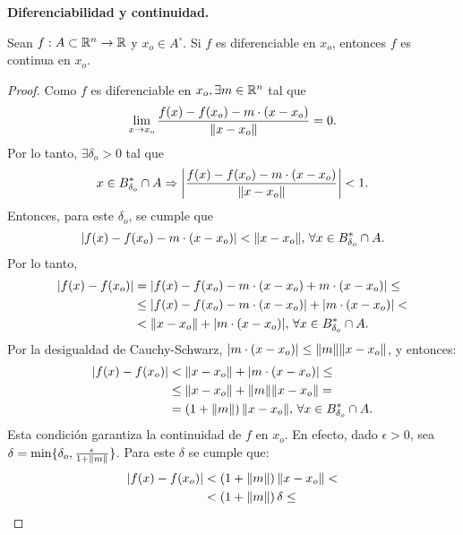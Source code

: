 \begin{theorem}\textbf{Diferenciabilidad y continuidad.} \label{teo:difCont}
\mbox{}

Sean $f: A \subset \mathbb{R}^n \to \mathbb{R}$ y $x_o \in  A^{\circ}$. Si $f$ es diferenciable en $x_o$, entonces $f$ es continua en $x_o$.
 \begin{proof}
 \mbox{}
 
 Como $f$ es diferenciable en $x_o, \exists m \in \mathbb{R}^n$ tal que
 \[
  \lim_{x \to x_o} \frac{f(x) - f(x_o) - m \cdot (x - x_o)}{\norm{x - x_o}} = 0.
 \]
Por lo tanto, $\exists \delta_o > 0$ tal que 
\[
 x \in B_{\delta_o}^* \cap A \Rightarrow 
 \abs{ \frac{f(x) - f(x_o) - m \cdot (x - x_o)}{\norm{x - x_o}} } < 1.
\]
Entonces, para este $\delta_o$, se cumple que
\[
 \abs{ f(x) - f(x_o) - m \cdot (x - x_o) } < \norm{x - x_o}, \, \forall x \in B_{\delta_o}^* \cap A.
\]
Por lo tanto,
\begin{align*}
\abs{ f(x) - f(x_o) } &=   \abs{ f(x) - f(x_o) - m \cdot (x - x_o) + m \cdot (x - x_o) } \le \\
                      &\le \abs{ f(x) - f(x_o) - m \cdot (x - x_o) } + \abs{ m \cdot (x - x_o) } < \\
                      &< \norm{x - x_o} + \abs{ m \cdot (x - x_o) }, \, 
                      \forall x \in B^*_{\delta_o} \cap A.
\end{align*}
Por la desigualdad de Cauchy-Schwarz, $\abs{ m \cdot (x - x_o) } \le \norm{m} \norm{x - x_o}$, y entonces:
\begin{align*}
\abs{ f(x) - f(x_o) } &< \norm{x - x_o} + \abs{ m \cdot (x - x_o) } \le \\
                      &\le \norm{x - x_o} + \norm{m} \norm{x - x_o} = \\
                      &=  \left( 1 + \norm{m} \right) \norm{x - x_o}, \, 
                      \forall x \in B^*_{\delta_o} \cap A.
\end{align*}
Esta condici\'on garantiza la continuidad de $f$ en $x_o$. En efecto, dado $\epsilon > 0$, sea $\delta = \min \{\delta_o, \frac{\epsilon}{1 + \norm{m}} \}$. Para este $\delta$ se cumple que:
\begin{align*}
 \abs{ f(x) - f(x_o) } &< \left( 1 + \norm{m} \right) \norm{x - x_o} < \\
                       &<   \left( 1 + \norm{m} \right) \delta \le \\

\end{align*}
\end{proof}
\end{theorem}
